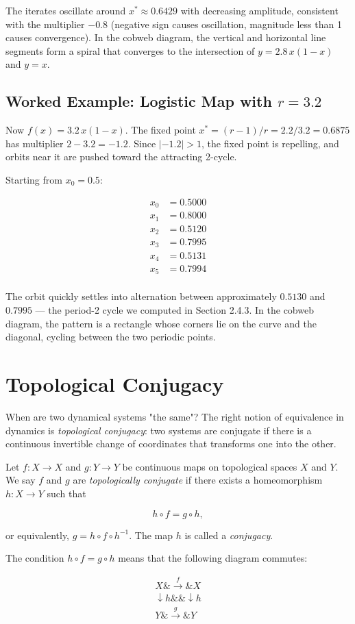 The iterates oscillate around $x^* \approx 0.6429$ with decreasing amplitude, consistent with the multiplier $-0.8$ (negative sign causes oscillation, magnitude less than 1 causes convergence). In the cobweb diagram, the vertical and horizontal line segments form a spiral that converges to the intersection of $y = 2.8\,x(1-x)$ and $y = x$.

\subsection{Worked Example: Logistic Map with $r = 3.2$}\label{sec:2.5.4}

Now $f(x) = 3.2\, x(1-x)$. The fixed point $x^* = (r-1)/r = 2.2/3.2 = 0.6875$ has multiplier $2 - 3.2 = -1.2$. Since $|-1.2| > 1$, the fixed point is repelling, and orbits near it are pushed toward the attracting 2-cycle.

Starting from $x_0 = 0.5$:

\[
\begin{aligned}
x_0 &= 0.5000 \\
x_1 &= 0.8000 \\
x_2 &= 0.5120 \\
x_3 &= 0.7995 \\
x_4 &= 0.5131 \\
x_5 &= 0.7994 \\
\end{aligned}
\]

The orbit quickly settles into alternation between approximately $0.5130$ and $0.7995$ --- the period-2 cycle we computed in Section 2.4.3. In the cobweb diagram, the pattern is a rectangle whose corners lie on the curve and the diagonal, cycling between the two periodic points.


\section{Topological Conjugacy}\label{sec:2.6}

When are two dynamical systems "the same"? The right notion of equivalence in dynamics is \textit{topological conjugacy}: two systems are conjugate if there is a continuous invertible change of coordinates that transforms one into the other.

\begin{definition}\label{def:2.10.}
Let $f: X \to X$ and $g: Y \to Y$ be continuous maps on topological spaces $X$ and $Y$. We say $f$ and $g$ are \textit{topologically conjugate} if there exists a homeomorphism $h: X \to Y$ such that

\[
h \circ f = g \circ h,
\]

or equivalently, $g = h \circ f \circ h^{-1}$. The map $h$ is called a \textit{conjugacy}.

The condition $h \circ f = g \circ h$ means that the following diagram commutes:

\[
\begin{array}{ccc}
X \& \xrightarrow{f} \& X \\
\downarrow h \& \& \downarrow h \\
Y \& \xrightarrow{g} \& Y
\end{array}
\]
\end{definition}


